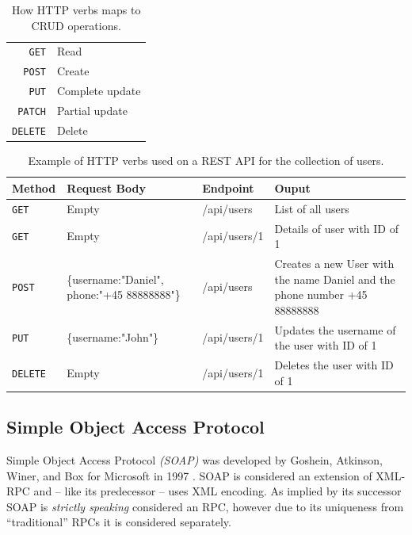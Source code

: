 			\begin{table}
				\begin{tabular}{r|l}
					\verb=GET= 		& Read 				\\
					\verb=POST= 	& Create 			\\
					\verb=PUT= 		& Complete update 	\\
					\verb=PATCH= 	& Partial update 	\\
					\verb=DELETE= 	& Delete 			\\
				\end{tabular}

				\caption{How HTTP verbs maps to CRUD operations.}
				\label{tbl:verbs}

			\end{table}

			\begin{table}
				\begin{tabular}{p{} | p{} | p{} | p{}}
					Method & Request Body & Endpoint & Ouput \\
					\hline
					\verb=GET= & Empty & /api/users & List of all users \\
					\hline
					\verb=GET= & Empty & /api/users/1 & Details of user with ID of 1 \\
					\hline
					\verb=POST= & \{username:"Daniel", phone:"+45 88888888"\} & /api/users & Creates a new User with the name Daniel and the phone number +45 88888888 \\
					\hline
					\verb=PUT= & \{username:"John"\} & /api/users/1 & Updates the username of the user with ID of 1\\
					\hline
					\verb=DELETE= & Empty & /api/users/1 & Deletes the user with ID of 1\\
				\end{tabular}

				\caption{Example of HTTP verbs used on a REST API for the collection of users.}
				\label{tbl:rest_example}

			\end{table}

		\subsection{Simple Object Access Protocol}
			Simple Object Access Protocol \emph{(SOAP)} was developed by Goshein, Atkinson, Winer, and Box for Microsoft in 1997 \cite{soap_origin}. SOAP is considered an extension of XML-RPC and -- like its predecessor -- uses XML encoding. As implied by its successor SOAP is \emph{strictly speaking} considered an RPC, however due to its uniqueness from ``traditional'' RPCs it is considered separately.

